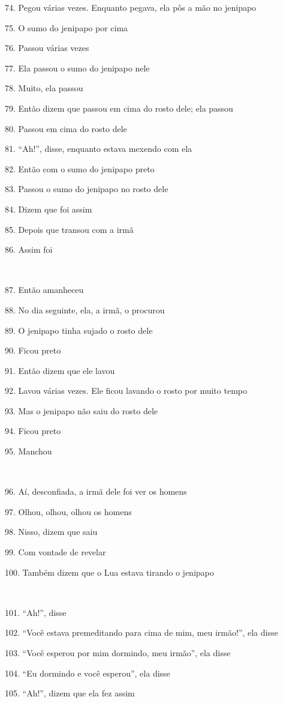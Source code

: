 74. Pegou várias vezes. Enquanto pegava, ela pôs a mão no jenipapo

75. O sumo do jenipapo por cima

76. Passou várias vezes

77. Ela passou o sumo do jenipapo nele

78. Muito, ela passou

79. Então dizem que passou em cima do rosto dele; ela passou

80. Passou em cima do rosto dele

81. ``Ah!'', disse, enquanto estava mexendo com ela

82. Então com o sumo do jenipapo preto

83. Passou o sumo do jenipapo no rosto dele

84. Dizem que foi assim

85. Depois que transou com a irmã

86. Assim foi

~

87. Então amanheceu

88. No dia seguinte, ela, a irmã, o procurou

89. O jenipapo tinha sujado o rosto dele

90. Ficou preto

91. Então dizem que ele lavou

92. Lavou várias vezes. Ele ficou lavando o rosto por muito tempo

93. Mas o jenipapo não saiu do rosto dele

94. Ficou preto

95. Manchou

~

96. Aí, desconfiada, a irmã dele foi ver os homens

97. Olhou, olhou, olhou os homens

98. Nisso, dizem que saiu

99. Com vontade de revelar

100. Também dizem que o Lua estava tirando o jenipapo

~

101. ``Ah!'', disse

102. ``Você estava premeditando para cima de mim, meu irmão!'', ela disse

103. ``Você esperou por mim dormindo, meu irmão'', ela disse

104. ``Eu dormindo e você esperou'', ela disse

105. ``Ah!'', dizem que ela fez assim

